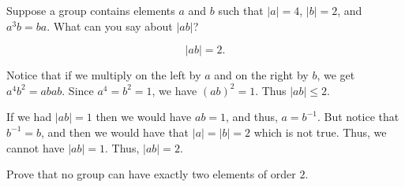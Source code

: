 \documentclass[12 pt, letterpaper]{hmcpset}
\begin{document}
\begin{problem}[3.]
	Suppose a group contains elements $a$ and $b$ such that $\vert a \vert = 4$, $\vert b \vert = 2$, and $a^{3}b = ba$. What can you say about $\vert ab \vert$?
\end{problem}

\begin{solution}
	\[
		\boxed{
			\vert ab \vert = 2.
		}
	\] 

	Notice that if we multiply on the left by $a$ and on the right by $b$, we get $a^{4} b^{2} = ab ab$. Since $a^{4} = b^{2} = 1$, we have $(ab)^{2} = 1$. Thus $\vert ab \vert \le 2$. 

	If we had $\vert ab \vert = 1$ then we would have $ab = 1$, and thus, $a = b^{-1}$. But notice that $b^{-1} = b$, and then we would have that $\vert a \vert = \vert b \vert = 2$ which is not true. Thus, we cannot have $\vert ab \vert = 1$. Thus, $\vert ab \vert = 2$.
\end{solution}

\pagebreak

\begin{problem}[4.]
	Prove that no group can have exactly two elements of order $2$.
\end{problem}
\end{document}

